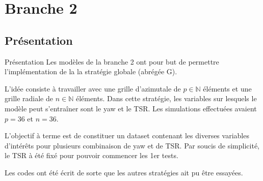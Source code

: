 \documentclass[
11pt,notheorems,hyperref={pdfauthor=whatever}
]{beamer}
\begin{document}


\section{Branche 2}

\subsection{Présentation}

\begin{frame}{Présentation}
    Les modèles de la branche 2 ont pour but de permettre l'implémentation de la la stratégie globale (abrégée G). 
    
    \vspace{0.3cm}

    L'idée consiste à travailler avec une grille d'azimutale de $p \in \mathbb{N}$ éléments et une grille radiale de $n \in \mathbb{N}$ éléments. 
    Dans cette stratégie, les variables sur lesquels le modèle peut s'entraîner sont le yaw et le TSR. Les simulations effectuées avaient $p = 36$ et $n = 36$. 

    \vspace{0.3cm}

    L'objectif à terme est de constituer un dataset contenant les diverses variables d'intérêts pour plusieurs combinaison de yaw et de TSR. Par soucis
    de simplicité, le TSR à été fixé pour pouvoir commencer les 1er tests.

    \vspace{0.3cm}

    Les codes ont été écrit de sorte que les autres stratégies ait pu être essayées.
\end{frame}
\end{document}
